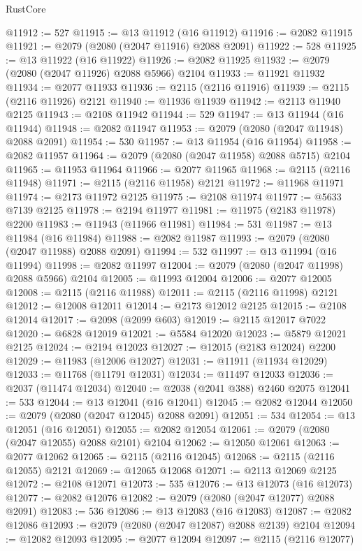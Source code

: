 \begin{lexlean}{RustCore}
\begin{coremodule}
@11912 := 527
@11915 := @13 @11912 (@16 @11912)
@11916 := @2082 @11915
@11921 := @2079 (@2080 (@2047 @11916) @2088 @2091)
@11922 := 528
@11925 := @13 @11922 (@16 @11922)
@11926 := @2082 @11925
@11932 := @2079 (@2080 (@2047 @11926) @2088 @5966) @2104
@11933 := @11921 @11932
@11934 := @2077 @11933
@11936 := @2115 (@2116 @11916)
@11939 := @2115 (@2116 @11926) @2121
@11940 := @11936 @11939
@11942 := @2113 @11940 @2125
@11943 := @2108 @11942
@11944 := 529
@11947 := @13 @11944 (@16 @11944)
@11948 := @2082 @11947
@11953 := @2079 (@2080 (@2047 @11948) @2088 @2091)
@11954 := 530
@11957 := @13 @11954 (@16 @11954)
@11958 := @2082 @11957
@11964 := @2079 (@2080 (@2047 @11958) @2088 @5715) @2104
@11965 := @11953 @11964
@11966 := @2077 @11965
@11968 := @2115 (@2116 @11948)
@11971 := @2115 (@2116 @11958) @2121
@11972 := @11968 @11971
@11974 := @2173 @11972 @2125
@11975 := @2108 @11974
@11977 := @5633 @7139 @2125
@11978 := @2194 @11977
@11981 := @11975 (@2183 @11978) @2200
@11983 := @11943 (@11966 @11981)
@11984 := 531
@11987 := @13 @11984 (@16 @11984)
@11988 := @2082 @11987
@11993 := @2079 (@2080 (@2047 @11988) @2088 @2091)
@11994 := 532
@11997 := @13 @11994 (@16 @11994)
@11998 := @2082 @11997
@12004 := @2079 (@2080 (@2047 @11998) @2088 @5966) @2104
@12005 := @11993 @12004
@12006 := @2077 @12005
@12008 := @2115 (@2116 @11988)
@12011 := @2115 (@2116 @11998) @2121
@12012 := @12008 @12011
@12014 := @2173 @12012 @2125
@12015 := @2108 @12014
@12017 := @2098 (@2099 @603)
@12019 := @2115 @12017 @7022
@12020 := @6828 @12019
@12021 := @5584 @12020
@12023 := @5879 @12021 @2125
@12024 := @2194 @12023
@12027 := @12015 (@2183 @12024) @2200
@12029 := @11983 (@12006 @12027)
@12031 := @11911 (@11934 @12029)
@12033 := @11768 (@11791 @12031)
@12034 := @11497 @12033
@12036 := @2037 (@11474 @12034)
@12040 := @2038 (@2041 @388) @2460 @2075
@12041 := 533
@12044 := @13 @12041 (@16 @12041)
@12045 := @2082 @12044
@12050 := @2079 (@2080 (@2047 @12045) @2088 @2091)
@12051 := 534
@12054 := @13 @12051 (@16 @12051)
@12055 := @2082 @12054
@12061 := @2079 (@2080 (@2047 @12055) @2088 @2101) @2104
@12062 := @12050 @12061
@12063 := @2077 @12062
@12065 := @2115 (@2116 @12045)
@12068 := @2115 (@2116 @12055) @2121
@12069 := @12065 @12068
@12071 := @2113 @12069 @2125
@12072 := @2108 @12071
@12073 := 535
@12076 := @13 @12073 (@16 @12073)
@12077 := @2082 @12076
@12082 := @2079 (@2080 (@2047 @12077) @2088 @2091)
@12083 := 536
@12086 := @13 @12083 (@16 @12083)
@12087 := @2082 @12086
@12093 := @2079 (@2080 (@2047 @12087) @2088 @2139) @2104
@12094 := @12082 @12093
@12095 := @2077 @12094
@12097 := @2115 (@2116 @12077)

\end{coremodule}
\end{lexlean}
